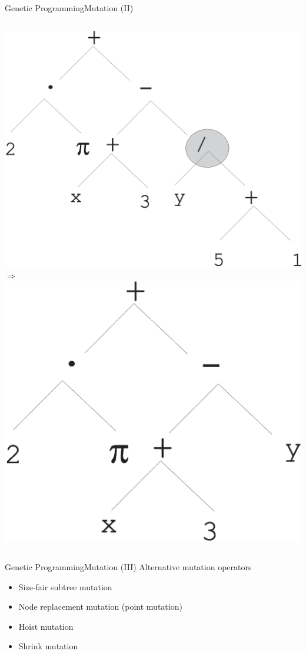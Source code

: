\documentclass[10pt,compress]{beamer} %
\begin{document}
\begin{frame}{Genetic Programming}{Mutation (II)}
    \begin{columns}
		\includegraphics[width=\linewidth]{figs/gpparentmutation.eps} 
		$\Rightarrow$ 
		\includegraphics[width=\linewidth]{figs/gpchildmutation.eps}
	\end{columns}
\end{frame}

\begin{frame}{Genetic Programming}{Mutation (III)} 
	Alternative mutation operators
	\begin{itemize}
		\item Size-fair subtree mutation
		\item Node replacement mutation (point mutation)
		\item Hoist mutation
		\item Shrink mutation
	\end{itemize}
\end{frame}
\end{document}
